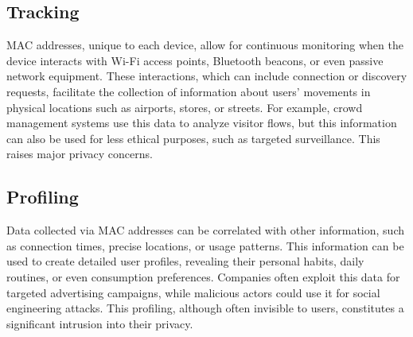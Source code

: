 \documentclass[aps,prb,twocolumn,superscriptaddress,floatfix,longbibliography,nofootinbib]{revtex4-2}
\begin{document}
  \subsection{\label{subsec:Tracking}Tracking}
  MAC addresses, unique to each device, allow for continuous monitoring when the 
  device interacts with Wi-Fi access points, Bluetooth beacons, or even passive network equipment.
  These interactions, which can include connection or discovery requests, facilitate 
  the collection of information about users' movements in physical locations such as airports,
  stores, or streets. For example, crowd management systems use this data to analyze visitor
  flows, but this information can also be used for less ethical purposes, such as targeted surveillance.
  This raises major privacy concerns.




  \subsection{\label{subsec:Profiling}Profiling}
  Data collected via MAC addresses can be correlated with other information, 
  such as connection times, precise locations, or usage patterns. This information
  can be used to create detailed user profiles, revealing their personal habits, daily routines,
  or even consumption preferences. Companies often exploit this data for targeted advertising campaigns,
  while malicious actors could use it for social engineering attacks. This profiling, 
  although often invisible to users, constitutes a significant intrusion into their privacy.
\end{document}
